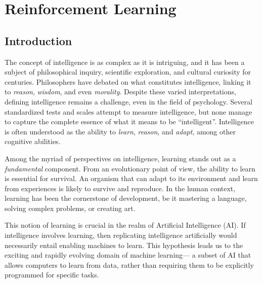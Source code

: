 \chapter{Reinforcement Learning}\label{chap:marl}

\minitoc%
\newcommand{\RS}{\mathcal{S}}
\newcommand{\RA}{\mathcal{A}}
\newcommand{\RP}{\mathcal{P}}
\newcommand{\RR}{\mathcal{R}}
\newcommand{\RE}{\mathbb{E}}

\section{Introduction}
The concept of intelligence is as complex as it is intriguing, 
 and it has been a subject of philosophical inquiry, scientific exploration, and cultural curiosity for centuries. 
 Philosophers have debated on what constitutes intelligence, 
 linking it to \emph{reason}, \emph{wisdom}, and even \emph{morality}. 
%
Despite these varied interpretations, 
 defining intelligence remains a challenge, even in the field of psychology. 
%
Several standardized tests and scales attempt to measure intelligence, 
 but none manage to capture the complete essence of what it means to be ``intelligent''. 
 Intelligence is often understood as the ability to \emph{learn}, \emph{reason}, and \emph{adapt}, among other cognitive abilities.

Among the myriad of perspectives on intelligence, learning stands out as a \emph{fundamental} component. 
 From an evolutionary point of view, the ability to learn is essential for survival. 
 An organism that can adapt to its environment and learn from experiences is likely to survive and reproduce. 
 In the human context, learning has been the cornerstone of development, be it mastering a language, solving complex problems, or creating art.

This notion of learning is crucial in the realm of Artificial Intelligence (AI). 
%
 If intelligence involves learning, 
 then replicating intelligence artificially would necessarily entail enabling machines to learn. 
 This hypothesis leads us to the exciting and rapidly evolving domain of machine learning---
 a subset of AI that allows computers to learn from data, rather than requiring them to be explicitly programmed for specific tasks.

